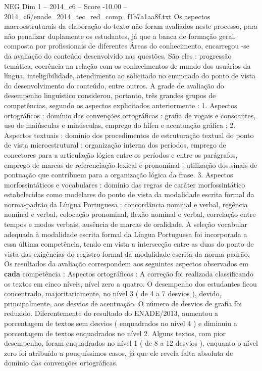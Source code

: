 \begin{textsample}{NEG Dim 1 – 2014\_c6 – Score -10.00 – 2014\_c6/enade\_2014\_tec\_red\_comp\_f1b7a1aa8f.txt}
Os aspectos macroestruturais da elaboração do texto não foram avaliados neste processo, para não penalizar duplamente os estudantes, já que a banca de formação geral, composta por profissionais de diferentes Áreas do conhecimento, encarregou -se da avaliação do conteúdo desenvolvido nas questões.
São eles : progressão temática, coerência na relação com os conhecimentos de mundo dos usuários da língua, inteligibilidade, atendimento ao solicitado no enunciado do ponto de vista do desenvolvimento do conteúdo, entre outros.
A grade de avaliação do desempenho linguístico considerou, portanto, três grandes grupos de competências, segundo os aspectos explicitados anteriormente : 1.
Aspectos ortográficos : domínio das convenções ortográficas : grafia de vogais e consoantes, uso de maiúsculas e minúsculas, emprego do hífen e acentuação gráfica ; 2.
Aspectos textuais : domínio dos procedimentos de estruturação textual do ponto de vista microestrutural : organização interna dos períodos, emprego de conectores para a articulação lógica entre os períodos e entre os parágrafos, emprego de marcas de referenciação lexical e pronominal ; utilização dos sinais de pontuação que contribuem para a organização lógica da frase. 3.
Aspectos morfossintáticos e vocabulares : domínio das regras de caráter morfossintático estabelecidas como modelares do ponto de vista da modalidade escrita formal da norma-padrão da Língua Portuguesa : concordância nominal e verbal, regência nominal e verbal, colocação pronominal, flexão nominal e verbal, correlação entre tempos e modos verbais, ausência de marcas de oralidade.
A seleção vocabular adequada à modalidade escrita formal da Língua Portuguesa foi incorporada a essa última competência, tendo em vista a intersecção entre as duas do ponto de vista das exigências do registro formal da modalidade escrita da norma-padrão.
Os resultados da avaliação correspondem aos seguintes aspectos observados em \textbf{cada} competência : Aspectos ortográficos : A correção foi realizada classificando os textos em cinco níveis, nível zero a quatro.
O desempenho dos estudantes ficou concentrado, majoritariamente, no nível 3 ( de 4 a 7 desvios ), devido, principalmente, aos desvios de acentuação.
O número de desvios de grafia foi reduzido.
Diferentemente do resultado do ENADE/2013, aumentou a porcentagem de textos sem desvios ( enquadrados no nível 4 ) e diminuiu a porcentagem de textos enquadrados no nível 2.
Alguns textos, com pior desempenho, foram enquadrados no nível 1 ( de 8 a 12 desvios ), enquanto o nível zero foi atribuído a pouquíssimos casos, já que ele revela falta absoluta de domínio das convenções ortográficas.

\end{textsample}
